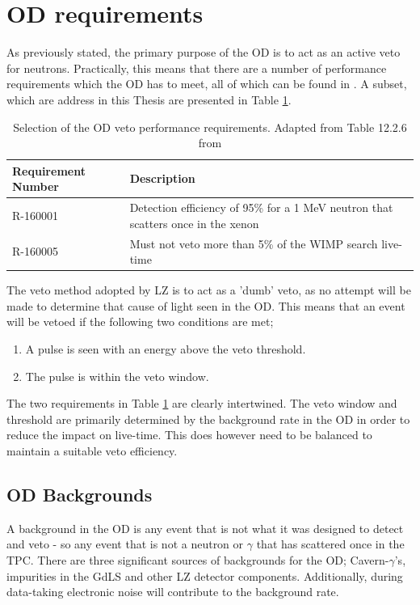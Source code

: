 \section{OD requirements}
\label{sec:simulated_od_requirements}
\par
As previously stated, the primary purpose of the OD is to act as an active veto for neutrons.
Practically, this means that there are a number of performance requirements which the OD has to meet, all of which can be found in \cite{LZ_TechnicalDesignReview_ref}.
A subset, which are address in this Thesis are presented in Table \ref{tab:veto_requirements}.

\begin{table}[!htbp]
    \centering
    \begin{tabular}{p{}p{}} %
    \hline
    {Requirement Number} & {Description} \\ \hline
    R-160001             & Detection efficiency of 95\% for a 1 MeV neutron that scatters once in the xenon \\
    R-160005             & Must not veto more than 5\% of the WIMP search live-time
    \end{tabular}
    \caption{Selection of the OD veto performance requirements. Adapted from Table 12.2.6 from \cite{LZ_TechnicalDesignReview_ref}}
    \label{tab:veto_requirements}
\end{table} 

\par
The veto method adopted by LZ is to act as a 'dumb' veto, as no attempt will be made to determine that cause of light seen in the OD.
This means that an event will be vetoed if the following two conditions are met;
\begin{enumerate}
    \item A pulse is seen with an energy above the veto threshold.
    \item The pulse is within the veto window.
\end{enumerate}
The two requirements in Table \ref{tab:veto_requirements} are clearly intertwined.
The veto window and threshold are primarily determined by the background rate in the OD in order to reduce the impact on live-time.
This does however need to be balanced to maintain a suitable veto efficiency.

\subsection{OD Backgrounds}
\par
A background in the OD is any event that is not what it was designed to detect and veto - so any event that is not a neutron or $\gamma$ that has scattered once in the TPC.
There are three significant sources of backgrounds for the OD; Cavern-$\gamma$'s, impurities in the GdLS and other LZ detector components.
Additionally, during data-taking electronic noise will contribute to the background rate. 

